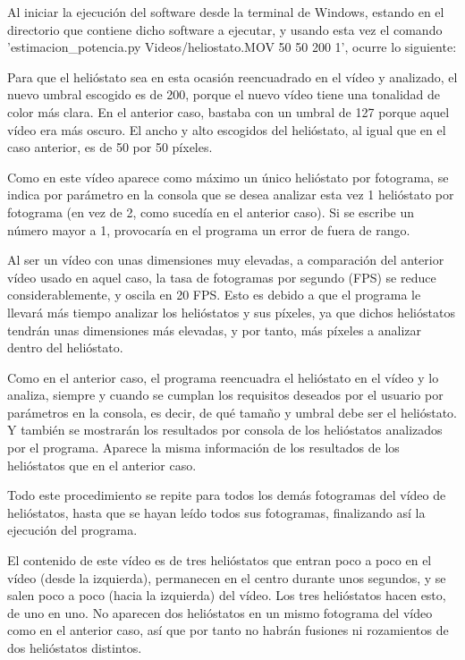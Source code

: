 \documentclass[12pt]{article}
\begin{document}
Al iniciar la ejecución del software desde la terminal de Windows, estando en el directorio que contiene dicho software a ejecutar, y usando esta vez el comando 'estimacion\_potencia.py Videos/heliostato.MOV 50 50 200 1', ocurre lo siguiente:

Para que el helióstato sea en esta ocasión reencuadrado en el vídeo y analizado, el nuevo umbral escogido es de 200, porque el nuevo vídeo tiene una tonalidad de color más clara. En el anterior caso, bastaba con un umbral de 127 porque aquel vídeo era más oscuro. El ancho y alto escogidos del helióstato, al igual que en el caso anterior, es de 50 por 50 píxeles.

Como en este vídeo aparece como máximo un único helióstato por fotograma, se indica por parámetro en la consola que se desea analizar esta vez 1 helióstato por fotograma (en vez de 2, como sucedía en el anterior caso). Si se escribe un número mayor a 1, provocaría en el programa un error de fuera de rango.

Al ser un vídeo con unas dimensiones muy elevadas, a comparación del anterior vídeo usado en aquel caso, la tasa de fotogramas por segundo (FPS) se reduce considerablemente, y oscila en 20 FPS. Esto es debido a que el programa le llevará más tiempo analizar los helióstatos y sus píxeles, ya que dichos helióstatos tendrán unas dimensiones más elevadas, y por tanto, más píxeles a analizar dentro del helióstato.

Como en el anterior caso, el programa reencuadra el helióstato en el vídeo y lo analiza, siempre y cuando se cumplan los requisitos deseados por el usuario por parámetros en la consola, es decir, de qué tamaño y umbral debe ser el helióstato. Y también se mostrarán los resultados por consola de los helióstatos analizados por el programa. Aparece la misma información de los resultados de los helióstatos que en el anterior caso.

Todo este procedimiento se repite para todos los demás fotogramas del vídeo de helióstatos, hasta que se hayan leído todos sus fotogramas, finalizando así la ejecución del programa.

El contenido de este vídeo es de tres helióstatos que entran poco a poco en el vídeo (desde la izquierda), permanecen en el centro durante unos segundos, y se salen poco a poco (hacia la izquierda) del vídeo. Los tres helióstatos hacen esto, de uno en uno. No aparecen dos helióstatos en un mismo fotograma del vídeo como en el anterior caso, así que por tanto no habrán fusiones ni rozamientos de dos helióstatos distintos.
\end{document}

